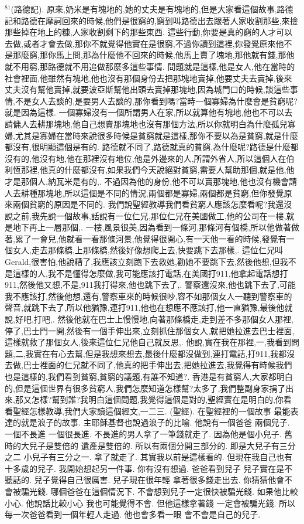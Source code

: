 \documentclass{book}
\begin{document}
$^{81}$(路德記).
原來,奶米是有塊地的,她的丈夫是有塊地的,但是大家看這個故事,路德記和路德在摩訶回來的時候,他們是很窮的,窮到叫路德出去跟著人家收割那些,來撿那些掉在地上的糠,人家收割剩下的那些東西.
這些行動,你要是真的窮的人才可以去做,或者才會去做,那你不就覺得他實在是很窮,不過你讀到這裡,你發覺原來他不是那麼窮,那你馬上問,那為什麼他不回來的時候,他馬上賣了塊地,那他就有錢,那他就不用窮,那路德就不用追做那麼多這些事情.
問題就是這樣,他是女人,他在當時的社會裡面,他雖然有塊地,他也沒有那個身份去把那塊地賣掉,他要丈夫去賣掉,後來丈夫沒有幫他賣掉,就要波亞斯幫他出頭去賣掉那塊地,因為城門口的時候,談這些事情,不是女人去談的,是要男人去談的,那你看到嗎?當時一個寡婦為什麼會是貧窮呢?就是因為這樣.
一個寡婦沒有一個所謂男人在家,所以就算他有塊地,他也不可以去請傭人去耕那塊地,他自己想賣那塊地也沒有那個方法,所以你就明白為什麼孤兒寡婦,尤其是寡婦在當時來說很多時候是貧窮就是這樣,那你不要以為是貧窮,就是什麼都沒有,很明顯這個是有的.
路德就不同了,路德就真的貧窮,為什麼呢?路德是什麼都沒有的,他沒有地,他在那裡沒有地位,他是外邊來的人,所謂外省人,所以這個人在伯利恆那裡,他真的什麼都沒有,如果我們今天說絕對貧窮,需要人幫助那個,就是他,他才是那個人,納瓦米是有的,.
不過因為他的身份,他不可以賣那塊地,他也沒有機會請人去耕種那塊地,所以這個是不同的情況,兩個都是寡婦,兩個都是貧窮,但你發覺原來兩個貧窮的原因是不同的.
我們說聖經教導我們看貧窮人應該怎麼看呢?我還沒說之前,我先說一個故事,話說有一位仁兄,那位仁兄在美國做工,他的公司在一樓,就是地下再上一層那個,.
一樓,風景很美,因為看到一條河,那條河有個橋,所以他做著做著,累了一會兒,他就看一看那條河景,他覺得很開心,有一天他一看的時候,發覺有一個女人,走去那條橋,上那條橋,然後好像想爬上去,快要跳下去那樣,.
這位仁兄叫Gerald,很害怕,他說糟了,我應該立刻跑下去救她,勸她不要跳下去,然後他想,但我不是這樣的人,我不是懂得怎麼做,我可能應該打電話,在美國打911,他拿起電話想打911,然後他又想,不是,911我打得來,他也跳下去了,.
警察還沒來,他也跳下去了,可能我不應該打,然後他想,還有,警察車來的時候很吵,容不如那個女人一聽到警察車的聲音,就跳下去了,所以他猶豫,連打911,他也在想應不應該打,他一直猶豫,最後他就說,好吧,打吧,.
然後他就在巴士上慢慢地,向著那條橋走,走到差不多那個女人那裡,停了,巴士門一開,然後有一個手伸出來,立刻抓住那個女人,就把她拉進去巴士裡面,這樣就救了那個女人,後來這位仁兄他自己就反思,.
他說,實在我在那裡,一,我看到問題,二,我實在有心去幫,但是我想來想去,最後什麼都沒做到,連打電話,打911,我都沒去做,巴士裡面的仁兄就不同了,他真的把手伸出去,把她拉進去,我覺得有時候我們也是這樣的,我們看到貧窮,貧窮的議題,有誰不知道?.
香港是有貧窮人,大家都明白的,但是這個世界有很多貧窮人,我們怎麼知道怎樣幫?太多了,我們整副身家捐了出來,那又怎樣?幫到誰?我明白這個問題,我覺得這個是對的,聖經實在是明白的,你看看聖經怎樣教導,我們大家讀這個經文,一二三.
(聖經).
在聖經裡的一個故事 最能表達的就是浪子的故事.
主耶穌基督也說過浪子的比喻.
他說有一個爸爸 兩個兒子.
一個不長進 一個很長進.
不長進的男人拿了一筆錢就走了.
因為他是個小兒子.
舊時的大兒子是雙倍的 遺產是雙倍的.
所以有兩個分開三部分的.
即是大兒子有三分之二 小兒子有三分之一.
拿了就走了.
其實我以前是這樣看的.
但現在我自己也有十多歲的兒子.
我開始想起另一件事.
你有沒有想過.
爸爸看到兒子 兒子實在是不聽話的.
兒子覺得自己很厲害.
兒子現在很年輕 拿著很多錢走出去.
你猜猜他會不會被騙光錢.
哪個爸爸在這個情況下.
不會想到兒子一定很快被騙光錢.
如果他比較小心.
他說話比較小心 我也可能覺得不會.
但他這樣拿著錢 一定會被騙光錢.
所以每一次爸爸看到一個年輕人走過.
他也會多看一眼 會不會是自己的兒子.
\end{document}
